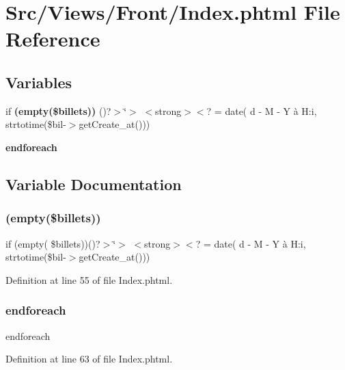 \section{Src/\+Views/\+Front/\+Index.phtml File Reference}
\label{_index_8phtml}
\subsection*{Variables}
\begin{DoxyCompactItemize}
\item 
if \textbf{ (empty(\$billets))} ()?$>$\char`\"{}$>$ $<$strong$>$$<$? = date(\textquotesingle{} d -\/ M -\/ Y à H\+:i\textquotesingle{}, strtotime(\$bil-\/$>$get\+Create\+\_\+at()))
\item 
\textbf{ endforeach}
\end{DoxyCompactItemize}


\subsection{Variable Documentation}
\mbox{\label{_index_8phtml_a49f678ce304830b8ec56c36be7d35ca5}} 
\subsubsection{(empty(\$billets))}
{\footnotesize\ttfamily if (empty( \$billets))()?$>$\char`\"{}$>$ $<$strong$>$$<$? = date(\textquotesingle{} d -\/ M -\/ Y à H\+:i\textquotesingle{}, strtotime(\$bil-\/$>$get\+Create\+\_\+at()))}



Definition at line 55 of file Index.\+phtml.

\mbox{\label{_index_8phtml_a672d9707ef91db026c210f98cc601123}} 
\subsubsection{endforeach}
{\footnotesize\ttfamily endforeach}



Definition at line 63 of file Index.\+phtml.

